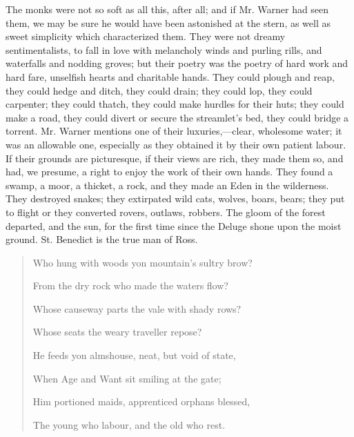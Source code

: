 The monks were not so soft as all this, after all; and if Mr.
Warner had seen them, we may be sure he would have been astonished at
the stern, as well as sweet simplicity which characterized them. They
were not dreamy sentimentalists, to fall in love with melancholy winds
and purling rills, and waterfalls and nodding groves; but their poetry
was the poetry of hard work and hard fare, unselfish hearts and
charitable hands. They could plough and reap, they could hedge and
ditch, they could drain; they could lop, they could carpenter; they
could thatch, they could make hurdles for their huts; they could make
a road, they could divert or secure the streamlet's bed, they could
bridge a torrent. Mr. Warner mentions one of their luxuries,—clear,
wholesome water; it was an allowable one, especially as they obtained
it by their own patient labour. If their grounds are picturesque, if
their views are rich, they made them so, and had, we presume, a right
to enjoy the work of their own hands. They found a swamp, a moor, a
thicket, a rock, and they made an Eden in the wilderness. They
destroyed snakes; they extirpated wild cats, wolves, boars, bears;
they put to flight or they converted rovers, outlaws, robbers. The
gloom of the forest departed, and the sun, for the first time since
the Deluge shone upon the moist ground. St. Benedict is the true
man of Ross.

\begin{quote}

Who hung with woods yon mountain's sultry brow?

From the dry rock who made the waters flow?

Whose causeway parts the vale with shady rows?

Whose seats the weary traveller repose?

He feeds yon almshouse, neat, but void of state,

When Age and Want sit smiling at the gate;

Him portioned maids, apprenticed orphans blessed,

The young who labour, and the old who rest.

\end{quote}

